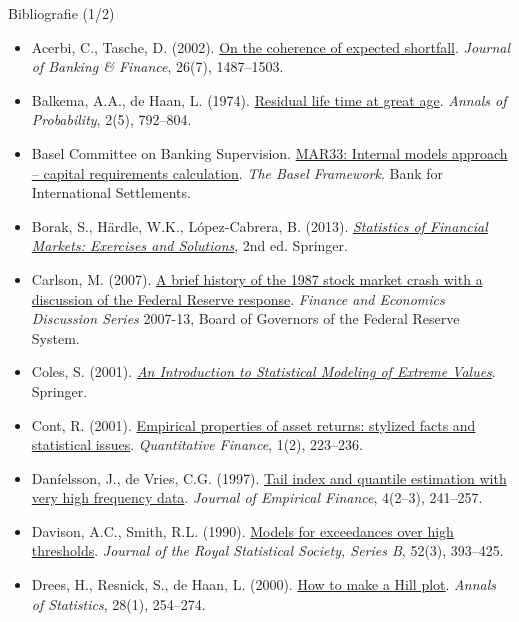 \begin{frame}{Bibliografie (1/2)}
\itemsize{\tiny}
\begin{itemize}
    \item Acerbi, C., Tasche, D. (2002). \href{https://doi.org/10.1016/S0378-4266(02)00283-2}{On the coherence of expected shortfall}. \textit{Journal of Banking \& Finance}, 26(7), 1487--1503.
    \item Balkema, A.A., de Haan, L. (1974). \href{https://doi.org/10.1214/aop/1176996548}{Residual life time at great age}. \textit{Annals of Probability}, 2(5), 792--804.
    \item Basel Committee on Banking Supervision. \href{https://www.bis.org/basel_framework/chapter/MAR/33.htm}{MAR33: Internal models approach -- capital requirements calculation}. \textit{The Basel Framework}. Bank for International Settlements.
    \item Borak, S., Härdle, W.K., López-Cabrera, B. (2013). \href{https://doi.org/10.1007/978-3-642-33929-5}{\textit{Statistics of Financial Markets: Exercises and Solutions}}, 2nd ed. Springer.
    \item Carlson, M. (2007). \href{https://www.federalreserve.gov/pubs/feds/2007/200713/200713pap.pdf}{A brief history of the 1987 stock market crash with a discussion of the Federal Reserve response}. \textit{Finance and Economics Discussion Series} 2007-13, Board of Governors of the Federal Reserve System.
    \item Coles, S. (2001). \href{https://doi.org/10.1007/978-1-4471-3675-0}{\textit{An Introduction to Statistical Modeling of Extreme Values}}. Springer.
    \item Cont, R. (2001). \href{https://doi.org/10.1080/713665670}{Empirical properties of asset returns: stylized facts and statistical issues}. \textit{Quantitative Finance}, 1(2), 223--236.
    \item Daníelsson, J., de Vries, C.G. (1997). \href{https://doi.org/10.1016/S0927-5398(97)00008-X}{Tail index and quantile estimation with very high frequency data}. \textit{Journal of Empirical Finance}, 4(2--3), 241--257.
    \item Davison, A.C., Smith, R.L. (1990). \href{https://doi.org/10.1111/j.2517-6161.1990.tb01796.x}{Models for exceedances over high thresholds}. \textit{Journal of the Royal Statistical Society, Series B}, 52(3), 393--425.
    \item Drees, H., Resnick, S., de Haan, L. (2000). \href{https://doi.org/10.1214/aos/1016120372}{How to make a Hill plot}. \textit{Annals of Statistics}, 28(1), 254--274.

\end{itemize}
\end{frame}
